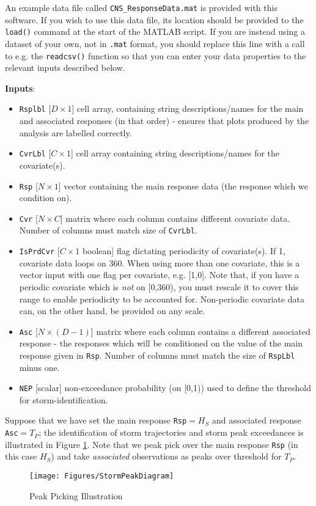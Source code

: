 An example data file called \verb|CNS_ResponseData.mat| is provided with this software. If you wish to use this data file, its location should be provided to the \verb|load()| command at the start of the MATLAB script. If you are instead using a dataset of your own, not in \verb|.mat| format, you should replace this line with a call to e.g. the \verb|readcsv()| function so that you can enter your data properties to the relevant inputs described below. 


\textbf{Inputs}:
	\begin{itemize}
		\item \verb|Rsplbl| [$D\times 1$]  cell array, containing string descriptions/names for the main and associated responses (in that order) - ensures that plots produced by the analysis are labelled correctly.
		\item \verb|CvrLbl| [$C\times 1$]  cell array containing string descriptions/names for the covariate(s).
		\item \verb|Rsp| [$N\times 1$] vector containing the main response data (the response which we condition on).
		\item\verb|Cvr| [$N\times C$] matrix where each column contains different covariate data. Number of columns must match size of \verb|CvrLbl|. 
		\item \verb|IsPrdCvr| [$C\times 1$ boolean] flag dictating periodicity of covariate(s). If 1, covariate data loops on 360. When using more than one covariate, this is a vector input with one flag per covariate, e.g. [1,0]. Note that, if you have a periodic covariate which is \textit{not} on [0,360), you must rescale it to cover this range to enable periodicity to be accounted for. Non-periodic covariate data can, on the other hand, be provided on any scale. 
		\item \verb|Asc| [$N \times (D-1)$] matrix where each column contains a different associated response - the responses which will be conditioned on the value of the main response given in \verb|Rsp|. Number of columns must match the size of \verb|RspLbl| minus one. 
		\item \verb|NEP| [scalar] non-exceedance probability (on [0,1)) used to define the threshold for storm-identification.
	\end{itemize}


Suppose that we have set the main response \verb|Rsp|$ = H_{S}$ and associated response  \verb|Asc|$ = T_{P}$; the identification of storm trajectories and storm peak exceedances is illustrated in Figure \ref{fig:StormPeak}. Note that we peak pick over the main response  \verb+Rsp+ (in this case $H_{S}$) and take \emph{associated} observations as peaks over threshold for $T_{P}$. 
\begin{figure}[hb]
\centering
\texttt{[image: Figures/StormPeakDiagram]}
\caption{Peak Picking Illustration}
\label{fig:StormPeak}
\end{figure}


